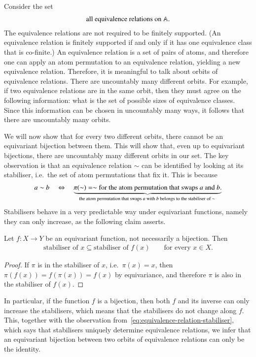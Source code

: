 \begin{myexample}
    Consider the set 
    \begin{align*}
     \text{all equivalence relations on $\mathbb A$}.
    \end{align*} 
    The equivalence relations are not required to be finitely supported. (An equivalence relation is finitely supported if and only if it has one equivalence class that is co-finite.) An equivalence relation is a set of pairs of atoms, and therefore one can apply an atom permutation to an equivalence relation, yielding a new equivalence relation. Therefore, it is meaningful to talk about orbits of equivalence relations. There are uncountably many different orbits. For example, if two equivalence relations are in the same orbit, then they must agree on the following information: what is the set of possible sizes of equivalence classes. Since this information can be chosen in uncountably many ways, it follows that there are uncountably many orbits. 

    We will now show that for every two different orbits, there cannot be an  equivariant bijection between them.  This will show that, even up to equivariant bijections, there are uncountably many different orbits in our set. The key observation is that an equivalence relation $\sim$ can be identified by looking at its stabiliser, i.e.~the set of atom permutations that fix it. This is because  
    \begin{align}
        \label{eq:equivalence-relation-stabiliser}
    a \sim b 
    \quad \Leftrightarrow \quad
    \myunderbrace{\pi(\sim) = \sim \text{for the atom permutation that swaps $a$ and $b$.}}{the atom permutation that swaps $a$ with $b$ belongs to the stabiliser of $\sim$}
    \end{align}
Stabilisers behave in a very predictable way under equivariant functions, namely they can only increase, as the following claim asserts.
    \begin{claim}\label{claim:equivariant-inclusion-stabiliser}
        Let $f : X \to Y$ be an equivariant function, not necessarily a bijection. Then 
        \begin{align*}
        \text{stabiliser of $x$} \subseteq  \text{stabiliser of $f(x)$} 
        \qquad \text{for every $x \in X$.}
        \end{align*}  
    \end{claim}
    \begin{proof}
        If $\pi$ is in the stabiliser of $x$, i.e.~$\pi(x)=x$, then $\pi(f(x))= f(\pi(x))= f(x)$ by equivariance, and therefore $\pi$ is also in the stabiliser of $f(x)$. 
    \end{proof}
    In particular, if the function $f$ is a bijection, then both $f$ and its inverse can only increase the stabilisers, which means that the stabilisers do not change along $f$. This, together with the observation from~\eqref{eq:equivalence-relation-stabiliser}, which says that stabilisers uniquely determine equivalence relations, we infer that an equivariant bijection between two orbits of equivalence relations can only be the identity. 
\end{myexample}

